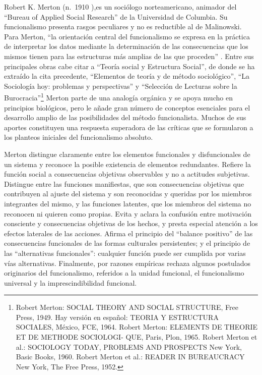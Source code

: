 \documentclass[
]{book}
\begin{document}
Robert K. Merton (n.~1910 ),es un sociólogo norteamericano, animador del ``Bureau of Applied Social Research'' de la Universidad de Columbia. Su funcionalismo presenta rasgos peculiares y no es reductible al de Malinowski. Para Merton, ``la orientación central del funcionalismo se expresa en la práctica de interpretar los datos mediante la determinación de las consecuencias que los mismos tienen para las estructuras más amplias de las que proceden'' . Entre sus principales obras cabe citar a ``Teoría social y Estructura Social'', de donde se ha extraído la cita precedente, ``Elementos de teoría y de método sociológico'', ``La Sociología hoy: problemas y perspectivas'' y ``Selección de Lecturas sobre la Burocracia''\footnote{Robert Merton: SOCIAL THEORY AND SOCIAL STRUCTURE, Free Press, 1949.
  Hay versión en español: TEORIA Y ESTRUCTURA SOCIALES, México, FCE, 1964.
  Robert Merton: ELEMENTS DE THEORIE ET DE METHODE SOCIOLOGI- QUE, Paris, Plon, 1965.
  Robert Merton et al.: SOCIOLOGY TODAY, PROBLEMS AND PROSPECTS New York, Basic Books, 1960.
  Robert Merton et al.: READER IN BUREAUCRACY New York, The Free Press, 1952.} Merton parte de una analogía orgánica y se apoya mucho en principios biológicos, pero le añade gran número de conceptos esenciales para el desarrollo amplio de las posibilidades del método funcionalista. Muchos de sus aportes constituyen una respuesta superadora de las críticas que se formularon a los planteos iniciales del funcionalismo absoluto.

Merton distingue claramente entre los elementos funcionales y disfuncionales de un sistema y reconoce la posible existencia de elementos redundantes. Refiere la función social a consecuencias objetivas observables y no a actitudes subjetivas. Distingue entre las funciones manifiestas, que son consecuencias objetivas que contribuyen al ajuste del sistema y son reconocidas y queridas por los miembros integrantes del mismo, y las funciones latentes, que los miembros del sistema no reconocen ni quieren como propias. Evita y aclara la confusión entre motivación consciente y consecuencias objetivas de los hechos, y presta especial atención a los efectos laterales de las acciones. Afirma el principio del ``balance positivo'' de las consecuencias funcionales de las formas culturales persistentes; y el principio de las ``alternativas funcionales'': cualquier función puede ser cumplida por varias vías alternativas. Finalmente, por razones empíricas rechaza algunos postulados originarios del funcionalismo, referidos a la unidad funcional, el funcionalismo universal y la imprescindibilidad funcional.
\end{document}
